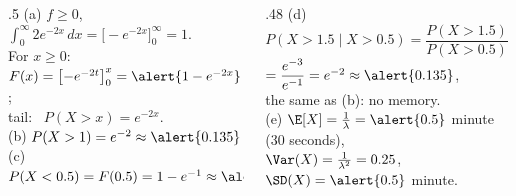 \begin{slides}
	\small
	\exstatement
	\pause
	\begin{columns}[T]
		\begin{column}{.5\textwidth}
			\sol (a) $f\ge0$, \
			$\int_0^{\infty}2e^{-2x}\,dx=\bigl[-e^{-2x}\bigr]_0^{\infty}=1$.\\
			For $x\ge0$: \
			$F(x)=\bigl[-e^{-2t}\bigr]_0^{x}=\alert{1-e^{-2x}}$;\\
			tail: \ $P(X>x)=e^{-2x}$.\\[1mm]
			\pause
			(b) $P(X>1)=e^{-2}\approx\alert{0.135}$\\[1mm]
			(c) $P(X<0.5)=F(0.5)=1-e^{-1}\approx\alert{0.632}$
		\end{column}
		\begin{column}{.48\textwidth}
			\pause
			(d) $P(X>1.5\mid X>0.5)=\dfrac{P(X>1.5)}{P(X>0.5)}$\\[1mm]
			\hspace*{2em}$=\dfrac{e^{-3}}{e^{-1}}=e^{-2}\approx\alert{0.135}$,\\[1mm]
			the same as (b): \alert{no memory}.\\[1mm]
			\pause
			(e) $\E[X]=\frac1\lambda=\alert{0.5}$ minute (30 seconds),\\
			$\Var(X)=\frac1{\lambda^2}=0.25$, \ $\SD(X)=\alert{0.5}$ minute.
		\end{column}
	\end{columns}
\end{slides}

